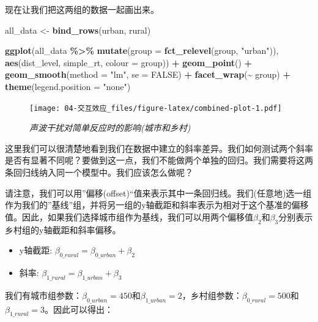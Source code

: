 \documentclass[
]{book}
\newenvironment{Shaded}{\begin{snugshade}}{\end{snugshade}}
\newcommand{\AttributeTok}[1]{\textcolor[rgb]{0.13,0.29,0.53}{#1}}
\newcommand{\ConstantTok}[1]{\textcolor[rgb]{0.56,0.35,0.01}{#1}}
\newcommand{\FunctionTok}[1]{\textcolor[rgb]{0.13,0.29,0.53}{\textbf{#1}}}
\newcommand{\NormalTok}[1]{#1}
\newcommand{\OtherTok}[1]{\textcolor[rgb]{0.56,0.35,0.01}{#1}}
\newcommand{\SpecialCharTok}[1]{\textcolor[rgb]{0.81,0.36,0.00}{\textbf{#1}}}
\newcommand{\StringTok}[1]{\textcolor[rgb]{0.31,0.60,0.02}{#1}}
\providecommand{\tightlist}{%
  \setlength{\itemsep}{0pt}\setlength{\parskip}{0pt}}
\begin{document}
现在让我们把这两组的数据一起画出来。

\begin{Shaded}
\begin{Highlighting}[]
\NormalTok{all\_data }\OtherTok{\textless{}{-}} \FunctionTok{bind\_rows}\NormalTok{(urban, rural)}

\FunctionTok{ggplot}\NormalTok{(all\_data }\SpecialCharTok{\%\textgreater{}\%} \FunctionTok{mutate}\NormalTok{(}\AttributeTok{group =} \FunctionTok{fct\_relevel}\NormalTok{(group, }\StringTok{"urban"}\NormalTok{)), }
       \FunctionTok{aes}\NormalTok{(dist\_level, simple\_rt, }\AttributeTok{colour =}\NormalTok{ group)) }\SpecialCharTok{+}
  \FunctionTok{geom\_point}\NormalTok{() }\SpecialCharTok{+}
  \FunctionTok{geom\_smooth}\NormalTok{(}\AttributeTok{method =} \StringTok{"lm"}\NormalTok{, }\AttributeTok{se =} \ConstantTok{FALSE}\NormalTok{) }\SpecialCharTok{+}
  \FunctionTok{facet\_wrap}\NormalTok{(}\SpecialCharTok{\textasciitilde{}}\NormalTok{ group) }\SpecialCharTok{+} 
  \FunctionTok{theme}\NormalTok{(}\AttributeTok{legend.position =} \StringTok{"none"}\NormalTok{)}
\end{Highlighting}
\end{Shaded}

\begin{figure}
\centering
\texttt{[image: 04-交互效应\_files/figure-latex/combined-plot-1.pdf]}
\caption{\label{fig:combined-plot}\emph{声波干扰对简单反应时的影响(城市和乡村)}}
\end{figure}

这里我们可以很清楚地看到我们在数据中建立的斜率差异。我们如何测试两个斜率是否有显著不同呢？要做到这一点，我们不能做两个单独的回归。我们需要将这两条回归线纳入同一个模型中。我们应该怎么做呢？

请注意，我们可以用''偏移(offset)``值来表示其中一条回归线。我们(任意地)选一组作为我们的''基线''组，并将另一组的y轴截距和斜率表示为相对于这个基准的偏移值。因此，如果我们选择城市组作为基线，我们可以用两个偏移值\(\beta_2\)和\(\beta_3\)分别表示乡村组的y轴截距和斜率偏移。

\begin{itemize}
\tightlist
\item
  y轴截距: \(\beta_{0\_rural} = \beta_{0\_urban} + \beta_2\)
\item
  斜率: \(\beta_{1\_rural} = \beta_{1\_urban} + \beta_3\)
\end{itemize}

我们有城市组参数：\(\beta_{0\_urban} = 450\)和\(\beta_{1\_urban} = 2\)，乡村组参数：\(\beta_{0\_rural} = 500\)和\(\beta_{1\_rural} = 3\)。因此可以得出：
\end{document}
